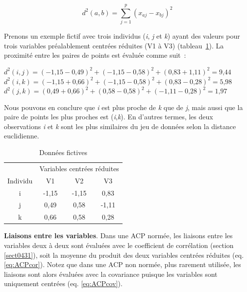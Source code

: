 \documentclass[
  11pt,
  french,
]{book}
\begin{document}
\footnotesize

\begin{equation}
d^2(a,b) = \sum_{j=1}^p(x_{aj}-x_{bj})^2
\label{eq:ACPdistEuc}
\end{equation}
\normalsize

Prenons un exemple fictif avec trois individus (\emph{i}, \emph{j} et \emph{k}) ayant des valeurs pour trois variables préalablement centrées réduites (V1 à V3) (tableau~\ref{tab:distanceACPindi}). La proximité entre les paires de points est évaluée comme suit~:

\(d^2(i,j)=(-\mbox{1,15}-\mbox{0,49})^2+(-\mbox{1,15}-\mbox{0,58})^2+(\mbox{0,83}+\mbox{1,11})^2=\mbox{9,44}\)
\(d^2(i,k)=(-\mbox{1,15}+\mbox{0,66})^2+(-\mbox{1,15}-\mbox{0,58})^2+(\mbox{0,83}-\mbox{0,28})^2=\mbox{5,98}\)
\(d^2(j,k)= (\mbox{0,49}+\mbox{0,66})^2+(\mbox{0,58}-\mbox{0,58})^2+(-\mbox{1,11}-\mbox{0,28})^2=\mbox{1,97}\)

Nous pouvons en conclure que \emph{i} est plus proche de \emph{k} que de \emph{j}, mais aussi que la paire de points les plus proches est (\emph{i},\emph{k}). En d'autres termes, les deux observations \emph{i} et \emph{k} sont les plus similaires du jeu de données selon la distance euclidienne.

\begin{table}

\caption{\label{tab:distanceACPindi}Données fictives}
\centering
\fontsize{8}{10}\selectfont
\begin{tabular}[t]{cccc}
\toprule
\multicolumn{1}{c}{ } & \multicolumn{3}{c}{Variables centrées réduites} \\
\cmidrule(l{3pt}r{3pt}){2-4}
Individu & V1 & V2 & V3\\
\midrule
i & -1,15 & -1,15 & 0,83\\
j & 0,49 & 0,58 & -1,11\\
k & 0,66 & 0,58 & 0,28\\
\bottomrule
\end{tabular}
\end{table}

\textbf{Liaisons entre les variables}. Dans une ACP normée, les liaisons entre les variables deux à deux sont évaluées avec le coefficient de corrélation (section \ref{sect0431}), soit la moyenne du produit des deux variables centrées réduites (eq. \eqref{eq:ACPcor}). Notez que dans une ACP non normée, plus rarement utilisée, les liaisons sont alors évaluées avec la covariance puisque les variables sont uniquement centrées (eq. \eqref{eq:ACPcov}).
\end{document}
